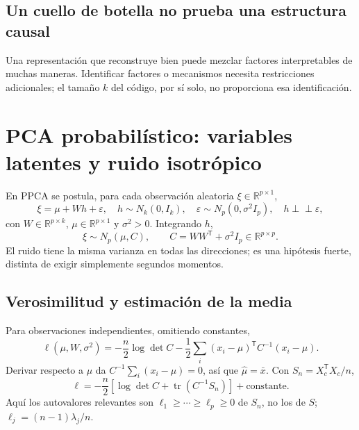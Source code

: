 \documentclass[11pt,a4paper]{article}
\newcommand{\R}{\mathbb R}
\newcommand{\T}{^{\mathsf T}}
\DeclareMathOperator{\tr}{tr}
\theoremstyle{definition}
\begin{document}
\subsection{Un cuello de botella no prueba una estructura causal}
Una representación que reconstruye bien puede mezclar factores interpretables de muchas maneras. Identificar factores o mecanismos necesita restricciones adicionales; el tamaño $k$ del código, por sí solo, no proporciona esa identificación.

\section{PCA probabilístico: variables latentes y ruido isotrópico}
En PPCA se postula, para cada observación aleatoria $\xi\in\R^{p\times1}$,
\[
\xi=\mu+Wh+\varepsilon,\quad
h\sim N_k(0,I_k),\quad\varepsilon\sim N_p(0,\sigma^2I_p),\quad h\perp\!\!\!\perp\varepsilon,
\]
con $W\in\R^{p\times k}$, $\mu\in\R^{p\times1}$ y $\sigma^2>0$. Integrando $h$,
\[
\xi\sim N_p(\mu,C),\qquad C=WW\T+\sigma^2I_p\in\R^{p\times p}.
\]
El ruido tiene la misma varianza en todas las direcciones; es una hipótesis fuerte, distinta de exigir simplemente segundos momentos.
\subsection{Verosimilitud y estimación de la media}
Para observaciones independientes, omitiendo constantes,
\[
\ell(\mu,W,\sigma^2)=-\frac n2\log\det C
-\frac12\sum_i(x_i-\mu)\T C^{-1}(x_i-\mu).
\]
Derivar respecto a $\mu$ da $C^{-1}\sum_i(x_i-\mu)=0$, así que $\widehat\mu=\bar x$. Con $S_n=X_c\T X_c/n$,
\[
\ell=-\frac n2\left[\log\det C+\tr(C^{-1}S_n)\right]+\text{constante}.
\]
Aquí los autovalores relevantes son $\ell_1\ge\cdots\ge\ell_p\ge0$ de $S_n$, no los de $S$; $\ell_j=(n-1)\lambda_j/n$.
\end{document}
